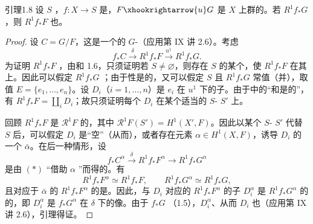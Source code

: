 \begin{SGAresult}{引理}{1.8}
设 $S$ ，$f:X\to S$ 是，$F\xhookrightarrow{u}G$ 是 $X$ 上群的。若 $R^1f_*G$ ，则 $R^1f_*F$ 也。
\end{SGAresult}
\begin{proof}
设 $C=G/F$，这是一个的 $G$-（应用第 IX 讲 2.6）。考虑
\[
f_*C\xrightarrow{\delta}R^1f_*F\xrightarrow{u^1}R^1f_*G.\tag{*}
\]
为证明 $R^1f_*F$ ，由和 1.6，只须证明若 $S\ne\varnothing$，则存在 $S$ 的某个，使 $R^1f_*F$ 在其上。因此可以假定 $R^1f_*G$ ；由于性是的，又可以假定 $S$ 且 $R^1f_*G$ 常值（并），取值 $E=\{e_1,\ldots,e_n\}$。设 $D_i$（$i=1,\ldots,n$）是 $e_i$ 在 $u^1$ 下的子。由于中的“和是的”，有 $R^1f_*F=\coprod_iD_i$；故只须证明每个 $D_i$ 在某个适当的 $S$- $S'$ 上。

回顾 $R^1f_*F$ 是 $\mathscr R^1F$ 的，其中 $\mathscr R^1F(S')=H^1(X',F)$。因此以某个 $S$- $S'$ 代替 $S$ 后，可以假定 $D_i$ 是“空”（从而），或者存在元素 $\alpha\in H^1(X,F)$，诱导 $D_i$ 的一个 $\bar\alpha$。在后一种情形，设
\[
f_*C^\alpha\xrightarrow{\delta}R^1f_*F^\alpha\longrightarrow R^1f_*G^\alpha
\]
是由 $(*)$ “借助 $\alpha$ ”而得的。有
\[
R^1f_*F^\alpha\simeq R^1f_*F,\qquad R^1f_*G^\alpha\simeq R^1f_*G,
\]
且对应于 $\bar\alpha$ 的 $R^1f_*F^\alpha$ 的是。因此，与 $D_i$ 对应的 $R^1f_*F^\alpha$ 的子 $D_i^\alpha$ 是 $R^1f_*G^\alpha$ 的的，即 $D_i^\alpha$ 是 $f_*G^\alpha$ 在 $\delta$ 下的像。由于 $f_*G$ （1.5），$D_i^\alpha$、从而 $D_i$ 也（应用第 IX 讲 2.6），引理得证。
\end{proof}
